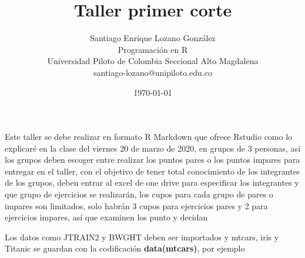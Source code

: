 \documentclass[12pt]{article} %
\title{Taller primer corte}
\author{Santiago Enrique Lozano González \\
	Programación en R \\
	Universidad Piloto de Colombia Seccional Alto Magdalena  \\
	santiago-lozano@unipiloto.edu.co \\
	}
\date{\today}
\begin{document}
\maketitle
Este taller se debe realizar en formato R Markdown que ofrece Rstudio como lo explicaré en la clase del viernes 20 de marzo de 2020, en grupos de 3 personas, así los grupos deben escoger entre realizar los puntos pares o los puntos impares para entregar en el taller, con el objetivo de tener total conocimiento de los integrantes de los grupos, deben entrar al excel de one drive para especificar los integrantes y que grupo de ejercicios se realizarán, los cupos para cada grupo de pares o impares son limitados, solo habrán 3 cupos para ejercicios pares y 2 para ejercicios impares, así que examinen los punto y decidan\par
Los datos como JTRAIN2 y BWGHT deben ser importados y mtcars, iris y Titanic se guardan con la codificación \textbf{data(mtcars)}, por ejemplo
\end{document}
